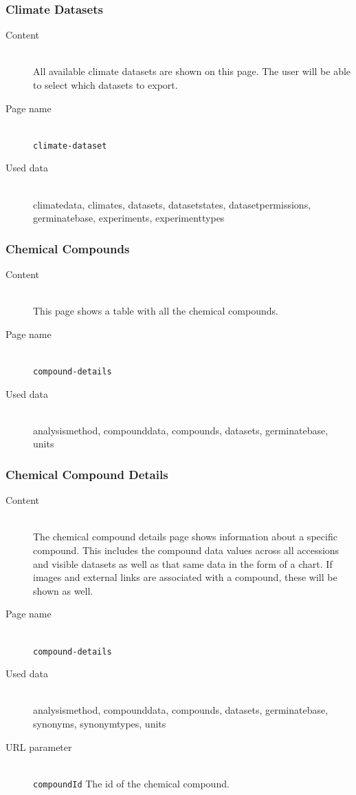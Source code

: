 \subsubsection{Climate Datasets}
\begin{description}
	\item[Content]\hfill\\All available climate datasets are shown on this page. The user will be able to select which datasets to export.
	\item[Page name]\hfill\\\texttt{climate-dataset}
	\item[Used data]\hfill\\climatedata, climates, datasets, datasetstates, datasetpermissions, germinatebase, experiments, experimenttypes
\end{description}

\subsubsection{Chemical Compounds}
\begin{description}
	\item[Content]\hfill\\This page shows a table with all the chemical compounds.
	\item[Page name]\hfill\\\texttt{compound-details}
	\item[Used data]\hfill\\analysismethod, compounddata, compounds, datasets, germinatebase, units
\end{description}

\subsubsection{Chemical Compound Details}
\begin{description}
	\item[Content]\hfill\\The chemical compound details page shows information about a specific compound. This includes the compound data values across all accessions and visible datasets as well as that same data in the form of a chart. If images and external links are associated with a compound, these will be shown as well.
	\item[Page name]\hfill\\\texttt{compound-details}
	\item[Used data]\hfill\\analysismethod, compounddata, compounds, datasets, germinatebase, synonyms, synonymtypes, units
	\item[URL parameter]\hfill\\\texttt{compoundId} The id of the chemical compound.
\end{description}

